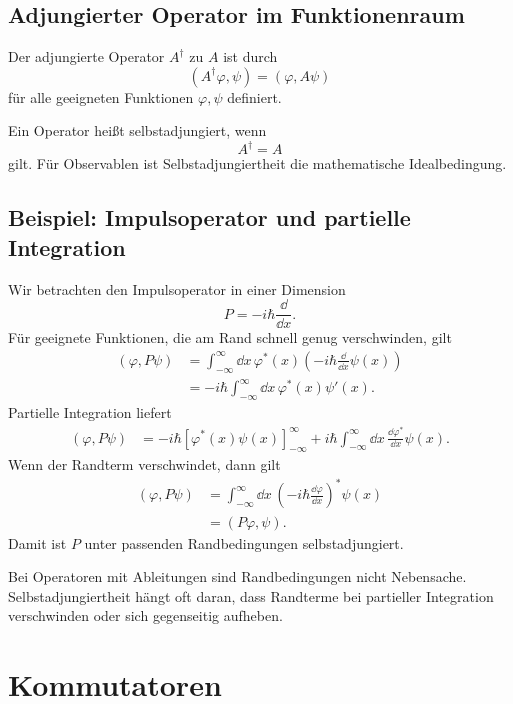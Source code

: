 \subsection{Adjungierter Operator im Funktionenraum}

\begin{definitionbox}
Der adjungierte Operator $A^\dagger$ zu $A$ ist durch
\[
    (A^\dagger\varphi,\psi)=(\varphi,A\psi)
\]
für alle geeigneten Funktionen $\varphi,\psi$ definiert.
\end{definitionbox}

Ein Operator heißt selbstadjungiert, wenn
\[
    A^\dagger=A
\]
gilt. Für Observablen ist Selbstadjungiertheit die mathematische Idealbedingung.

\subsection{Beispiel: Impulsoperator und partielle Integration}

Wir betrachten den Impulsoperator in einer Dimension
\[
    P=-i\hbar\frac{\dd}{\dd x}.
\]
Für geeignete Funktionen, die am Rand schnell genug verschwinden, gilt
\[
\begin{aligned}
(\varphi,P\psi)
&=\int_{-\infty}^{\infty}\dd x\,\varphi^*(x)\left(-i\hbar\frac{\dd}{\dd x}\psi(x)\right)\\
&=-i\hbar\int_{-\infty}^{\infty}\dd x\,\varphi^*(x)\psi'(x).
\end{aligned}
\]
Partielle Integration liefert
\[
\begin{aligned}
(\varphi,P\psi)
&=-i\hbar\left[\varphi^*(x)\psi(x)\right]_{-\infty}^{\infty}
+i\hbar\int_{-\infty}^{\infty}\dd x\,\frac{\dd\varphi^*}{\dd x}\psi(x).
\end{aligned}
\]
Wenn der Randterm verschwindet, dann gilt
\[
\begin{aligned}
(\varphi,P\psi)
&=\int_{-\infty}^{\infty}\dd x\,\left(-i\hbar\frac{\dd\varphi}{\dd x}\right)^*\psi(x)\\
&=(P\varphi,\psi).
\end{aligned}
\]
Damit ist $P$ unter passenden Randbedingungen selbstadjungiert.

\begin{examtipbox}
Bei Operatoren mit Ableitungen sind Randbedingungen nicht Nebensache. Selbstadjungiertheit hängt oft daran, dass Randterme bei partieller Integration verschwinden oder sich gegenseitig aufheben.
\end{examtipbox}

\section{Kommutatoren}

